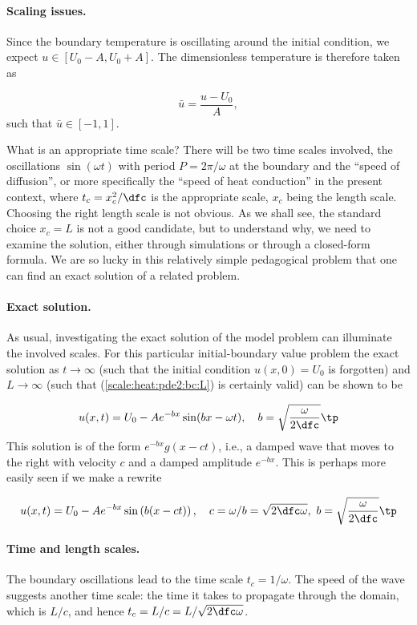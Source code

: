\documentclass[graybox,envcountchap,sectrefs,final]{svmonodo}
\begin{document}
\paragraph{Scaling issues.}
Since the boundary temperature is oscillating around the initial
condition, we expect $u\in [U_0-A,U_0+A]$.
The dimensionless temperature is therefore taken as

\[ \bar u = \frac{u-U_0}{A},\]
such that $\bar u\in [-1,1]$.

What is an appropriate time scale? There will be two time scales involved,
the oscillations $\sin(\omega t)$ with period $P=2\pi/\omega$ at
the boundary and the ``speed of diffusion'', or more specifically
the ``speed of heat conduction'' in the present context,
where $t_c=x_c^2/\dfc$ is the appropriate scale, $x_c$ being
the length scale. Choosing the right length scale is not obvious. As
we shall see, the standard choice $x_c=L$ is not a good candidate, but
to understand why, we need to examine the solution, either through
simulations or through a closed-form formula. We are so lucky in this
relatively simple pedagogical problem that one can find an exact solution
of a related problem.

\paragraph{Exact solution.}
As usual, investigating the exact solution of the model problem can
illuminate the involved scales. For this particular initial-boundary
value problem the exact solution as $t\rightarrow\infty$
(such that
the initial condition $u(x,0)=U_0$ is forgotten)
and $L\rightarrow\infty$ (such that (\ref{scale:heat:pde2:bc:L})
is certainly valid) can be shown to be

\begin{equation}
u(x,t) = U_0 - Ae^{-bx}\sin (bx - \omega t),\quad b =\sqrt{\frac{\omega}{2\dfc}}\tp
\label{scale:heat:daynight:sol}
\end{equation}
This solution is of the form $e^{-bx}g(x-ct)$, i.e., a damped wave that
moves to the right with velocity $c$ and a damped amplitude $e^{-bx}$.
This is perhaps more easily seen if we make a rewrite

\[ u(x,t) = U_0 - Ae^{-bx}\sin\left(b(x - ct)\right),\quad
c=\omega/b = \sqrt{2\dfc\omega},\  b =\sqrt{\frac{\omega}{2\dfc}}\tp\]

\paragraph{Time and length scales.}
The boundary oscillations lead to the time scale $t_c=1/\omega$.
The speed of the wave suggests another time scale: the time it
takes to propagate through the domain, which is $L/c$, and
hence $t_c = L/c = L/\sqrt{2\dfc\omega}$.
\end{document}
